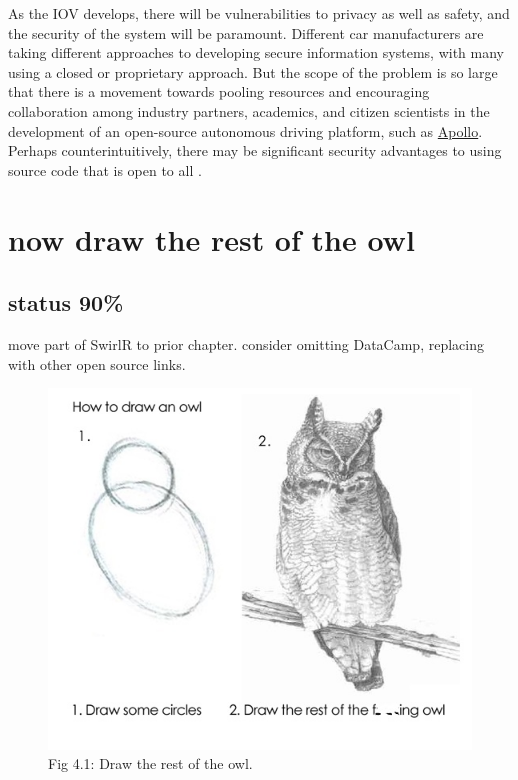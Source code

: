\documentclass[
  openany]{book}
\begin{document}
As the IOV develops, there will be vulnerabilities to privacy as well as safety, and the security of the system will be paramount. Different car manufacturers are taking different approaches to developing secure information systems, with many using a closed or proprietary approach. But the scope of the problem is so large that there is a movement towards pooling resources and encouraging collaboration among industry partners, academics, and citizen scientists in the development of an open-source autonomous driving platform, such as \href{http://apollo.auto/}{Apollo}. Perhaps counterintuitively, there may be significant security advantages to using source code that is open to all \citep{clarke2009open, fitzgerald2016open}.

\hypertarget{now-draw-the-rest-of-the-owl}{%
\chapter{now draw the rest of the owl}\label{now-draw-the-rest-of-the-owl}}

\hypertarget{status-90-2}{%
\section*{status 90\%}\label{status-90-2}}

move part of SwirlR to prior chapter. consider omitting DataCamp, replacing with other open source links.

\begin{figure}
\centering
\includegraphics{InkedrCr9A_LI.jpg}
\caption{Fig 4.1: Draw the rest of the owl.}
\end{figure}
\end{document}
